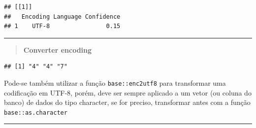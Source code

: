 \documentclass[
]{book}
\newenvironment{Shaded}{\begin{snugshade}}{\end{snugshade}}
\newcommand{\AttributeTok}[1]{\textcolor[rgb]{0.77,0.63,0.00}{#1}}
\newcommand{\CommentTok}[1]{\textcolor[rgb]{0.56,0.35,0.01}{\textit{#1}}}
\newcommand{\DecValTok}[1]{\textcolor[rgb]{0.00,0.00,0.81}{#1}}
\newcommand{\FunctionTok}[1]{\textcolor[rgb]{0.00,0.00,0.00}{#1}}
\newcommand{\NormalTok}[1]{#1}
\newcommand{\OtherTok}[1]{\textcolor[rgb]{0.56,0.35,0.01}{#1}}
\newcommand{\SpecialCharTok}[1]{\textcolor[rgb]{0.00,0.00,0.00}{#1}}
\newcommand{\StringTok}[1]{\textcolor[rgb]{0.31,0.60,0.02}{#1}}
\theoremstyle{definition}
\theoremstyle{definition}
\theoremstyle{definition}
\theoremstyle{definition}
\theoremstyle{remark}
\begin{document}
\begin{verbatim}
## [[1]]
##   Encoding Language Confidence
## 1    UTF-8                0.15
\end{verbatim}

\begin{center}\rule{0.5\linewidth}{0.5pt}\end{center}

\begin{quote}
\textbf{Converter encoding}
\end{quote}

\begin{Shaded}
\end{Shaded}

\begin{verbatim}
## [1] "4" "4" "7"
\end{verbatim}

Pode-se também utilizar a função \texttt{base::enc2utf8} para transformar uma codificação em UTF-8, porém, deve ser sempre aplicado a um vetor (ou coluna do banco) de dados do tipo character, se for preciso, transformar antes com a função \texttt{base::as.character}

\begin{Shaded}
\end{Shaded}

\begin{center}\rule{0.5\linewidth}{0.5pt}\end{center}
\end{document}
